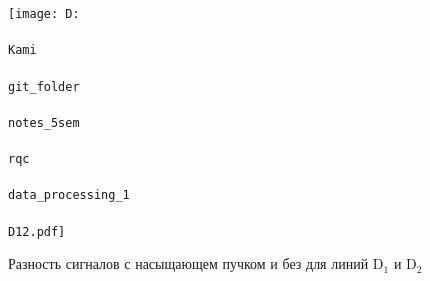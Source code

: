 \begin{figure}[h]
    \centering
    \texttt{[image: D:\\\\Kami\\\\git\_folder\\\\notes\_5sem\\\\rqc\\\\data\_processing\_1\\\\D12.pdf]}
    \caption{Разность сигналов с насыщающем пучком и без для линий D${}_1$ и D${}_2$}
    \label{fig:exp1}
\end{figure}
